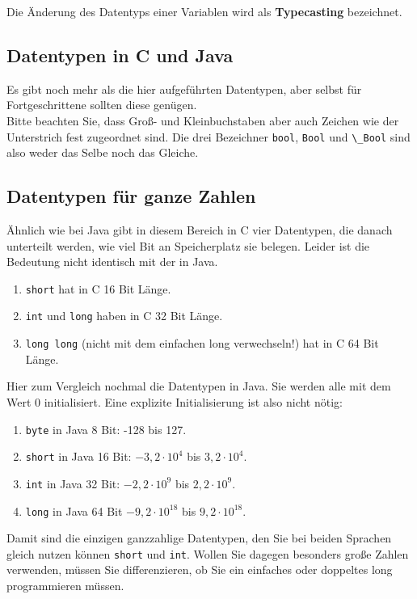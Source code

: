 Die Änderung des Datentyps einer Variablen wird als \textbf{Typecasting} bezeichnet.

\subsection{Datentypen in C und Java}

Es gibt noch mehr als die hier aufgeführten Datentypen, aber selbst für Fortgeschrittene sollten diese genügen.\\ 

Bitte beachten Sie, dass Groß- und Kleinbuchstaben aber auch Zeichen wie der Unterstrich fest zugeordnet sind. Die drei Bezeichner \verb|bool|, \verb|Bool| und \verb|\_Bool| sind also weder das Selbe noch das Gleiche.

\subsection{Datentypen für ganze Zahlen}

Ähnlich wie bei Java gibt in diesem Bereich in C vier Datentypen, die danach unterteilt werden, wie viel Bit an Speicherplatz sie belegen. Leider ist die Bedeutung nicht identisch mit der in Java.

\begin{enumerate}
	\item \verb|short| hat in C 16 Bit Länge.
	\item \verb|int| und \verb|long| haben in C 32 Bit Länge.
	\item \verb|long long| (nicht mit dem einfachen long verwechseln!) hat in C 64 Bit Länge.
\end{enumerate}

Hier zum Vergleich nochmal die Datentypen in Java. Sie werden alle mit dem Wert 0 initialisiert. Eine explizite Initialisierung ist also nicht nötig:

\begin{enumerate}
	\item \verb|byte| in Java 8 Bit: -128 bis 127.
	\item \verb|short| in Java 16 Bit: \(-3,2 \cdot 10^4\) bis \(3,2 \cdot 10^4\).
	\item \verb|int| in Java 32 Bit: \(-2,2 \cdot 10^9\) bis \(2,2 \cdot 10^9\).
	\item \verb|long| in Java 64 Bit \(-9,2 \cdot 10^18\) bis \(9,2 \cdot 10^18\).
\end{enumerate}

Damit sind die einzigen ganzzahlige Datentypen, den Sie bei beiden Sprachen gleich nutzen können \verb|short| und \verb|int|. Wollen Sie dagegen besonders große Zahlen verwenden, müssen Sie differenzieren, ob Sie ein einfaches oder doppeltes long programmieren müssen.

